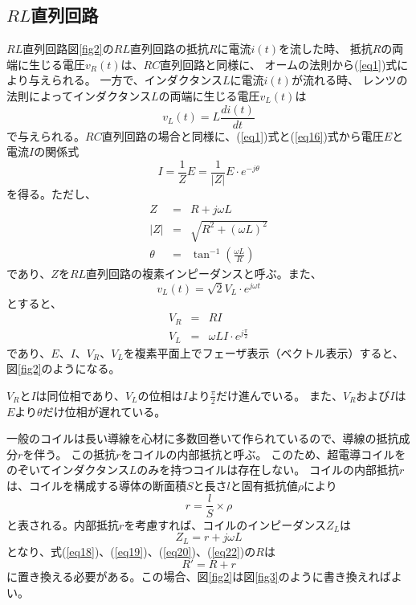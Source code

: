 \documentclass[12pt]{jarticle}
\begin{document}
\subsection{$RL$直列回路}
$RL$直列回路図\ref{fig2}の$RL$直列回路の抵抗$R$に電流$i(t)$を流した時、
抵抗$R$の両端に生じる電圧$v_R(t)$は、$RC$直列回路と同様に、
オームの法則から(\ref{eq1})式により与えられる。
一方で、インダクタンス$L$に電流$i(t)$が流れる時、
レンツの法則によってインダクタンス$L$の両端に生じる電圧$v_L(t)$は
\begin{equation}
    v_L(t)=L\frac{di(t)}{dt}
    \label{eq16}
\end{equation}
で与えられる。$RC$直列回路の場合と同様に、(\ref{eq1})式と(\ref{eq16})式から電圧$E$と電流$I$の関係式
\begin{equation}
    I=\frac{1}{Z}E=\frac{1}{|Z|}E\cdot e^{-j\theta}
    \label{eq17}
\end{equation}
を得る。ただし、
\begin{eqnarray}
    Z&=&R+j\omega L \label{eq18}\\
    |Z|&=&\sqrt{R^2+\left(\omega L\right)^2} \label{eq19}\\
    \theta&=&\tan^{-1}\left(\frac{\omega L}{R}\right) \label{eq20}
\end{eqnarray}
であり、$Z$を$RL$直列回路の複素インピーダンスと呼ぶ。また、
\begin{equation}
    v_L(t)=\sqrt{2}V_L\cdot e^{j\omega t}
    \label{eq21}
\end{equation}
とすると、
\begin{eqnarray}
    V_R&=&RI \label{eq22}\\
    V_L&=&\omega LI\cdot e^{j\frac{\pi}{2}} \label{eq23}
\end{eqnarray}
であり、$E$、$I$、$V_R$、$V_L$を複素平面上でフェーザ表示（ベクトル表示）すると、
図\ref{fig2}のようになる。

$V_R$と$I$は同位相であり、$V_L$の位相は$I$より$\frac{\pi}{2}$だけ進んでいる。
また、$V_R$および$I$は$E$より$\theta$だけ位相が遅れている。

一般のコイルは長い導線を心材に多数回巻いて作られているので、導線の抵抗成分$r$を伴う。
この抵抗$r$をコイルの内部抵抗と呼ぶ。
このため、超電導コイルをのぞいてインダクタンス$L$のみを持つコイルは存在しない。
コイルの内部抵抗$r$は、コイルを構成する導体の断面積$S$と長さ$l$と固有抵抗値$\rho$により
\begin{equation}
    r=\frac{l}{S}\times\rho
    \label{eq24}
\end{equation}
と表される。内部抵抗$r$を考慮すれば、コイルのインピーダンス$Z_L$は
\begin{equation}
    Z_L=r+j\omega L
    \label{eq25}
\end{equation}
となり、式(\ref{eq18})、(\ref{eq19})、(\ref{eq20})、(\ref{eq22})の$R$は
\begin{equation}
    R'=R+r
    \label{eq26}
\end{equation}
に置き換える必要がある。この場合、図\ref{fig2}は図\ref{fig3}のように書き換えればよい。
\end{document}
